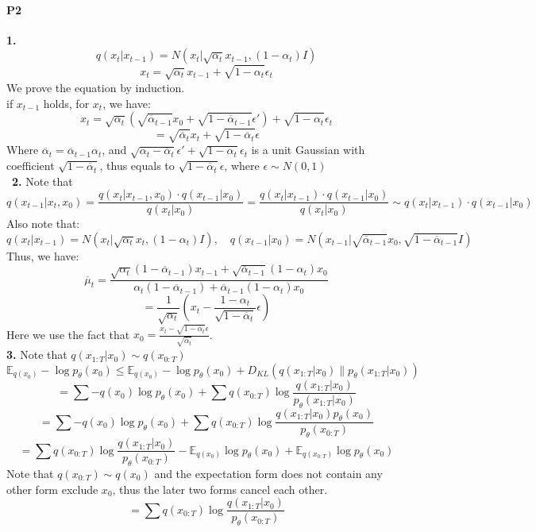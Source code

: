 \documentclass[a4 paper,12pt]{article}
\theoremstyle{definitionstyle}
\begin{document}
\paragraph{P2}\textbf{1.}
\[
  q(x_t|x_{t-1})=N(x_t|\sqrt{\alpha_t}x_{t-1},(1-\alpha_t)I)
\]
\[
  x_t = \sqrt{\alpha_t}x_{t-1}+\sqrt{1-\alpha_t}\epsilon_t
\]
We prove the equation by induction.\\
if $x_{t-1}$ holds, for $x_t$, we have:
\[
  x_t=\sqrt{\alpha_t}(\sqrt{\overline\alpha_{t-1}}x_0+\sqrt{1-\overline\alpha_{t-1}}\epsilon')+\sqrt{1-\alpha_t}\epsilon_t
\]
\[
  =\sqrt{\overline\alpha_t}x_t+\sqrt{1-\overline\alpha_t}\epsilon
\]
Where $\overline\alpha_t=\overline\alpha_{t-1}\alpha_t$, and $\sqrt{\alpha_t-\overline\alpha_t}\epsilon'+\sqrt{1-\alpha_t}\epsilon_t$ is a unit Gaussian with coefficient $\sqrt{1-\overline\alpha_t}$, thus equals to $\sqrt{1-\overline\alpha_t}\epsilon$, where $\epsilon\sim N(0,1)$\\\
\textbf{2.} Note that
\[
  q(x_{t-1}|x_t,x_0)=\frac{q(x_t|x_{t-1},x_0)\cdot q(x_{t-1}|x_0)}{q(x_t|x_0)}=\frac{q(x_t|x_{t-1})\cdot q(x_{t-1}|x_0)}{q(x_t|x_0)}\sim q(x_t|x_{t-1})\cdot q(x_{t-1}|x_0)
\]
Also note that:
\[
  q(x_t|x_{t-1})=N(x_t|\sqrt{\alpha_t}x_{t},(1-\alpha_t)I), \quad q(x_{t-1}|x_0)=N(x_{t-1}|\sqrt{\overline\alpha_{t-1}}x_0,\sqrt{1-\overline\alpha_{t-1}}I)
\]
Thus, we have:
\[
  \overline\mu_t=\frac{\sqrt{\alpha_t}(1-\overline\alpha_{t-1})x_{t-1}+\sqrt{\overline\alpha_{t-1}}(1-\alpha_t)x_0}{\alpha_t(1-\overline\alpha_{t-1})+\overline\alpha_{t-1}(1-\alpha_t)x_0}
\]
\[
  =\frac{1}{\sqrt{\alpha_t}}(x_t-\frac{1-\alpha_t}{\sqrt{1-\overline\alpha_t}}\epsilon)
\]
Here we use the fact that $x_0=\frac{x_t-\sqrt{1-\overline\alpha_t}\epsilon}{\sqrt{\overline\alpha_t}}$.\\
\textbf{3.}
Note that $q(x_{1:T}|x_0)\sim q(x_{0:T})$
\[
  \mathbb{E}_{q(x_0)}-\log p_\theta (x_0)\le \mathbb{E}_{q(x_0)}-\log p_\theta(x_0)+D_{KL}(q(x_{1:T}|x_0)\|p_\theta(x_{1:T}|x_0))
\]
\[
  =\sum -q(x_0)\log p_\theta(x_0)+\sum q(x_{0:T})\log\frac{q(x_{1:T}|x_0)}{p_\theta(x_{1:T}|x_0)}
\]
\[
  =\sum -q(x_0)\log p_\theta(x_0)+\sum q(x_{0:T})\log\frac{q(x_{1:T}|x_0)p_\theta(x_0)}{p_\theta(x_{0:T})}
\]
\[
  =\sum q(x_{0:T})\log\frac{q(x_{1:T}|x_0)}{p_\theta(x_{0:T})}-\mathbb{E}_{q(x_0)}\log p_\theta(x_0)+\mathbb{E}_{q(x_{0:T})}\log p_\theta(x_0)
\]
Note that $q(x_{0:T})\sim q(x_0)$ and the expectation form does not contain any other form exclude $x_0$, thus the later two forms cancel each other.\\
\[
  =\sum q(x_{0:T})\log\frac{q(x_{1:T}|x_0)}{p_\theta(x_{0:T})}
\]
\end{document}
